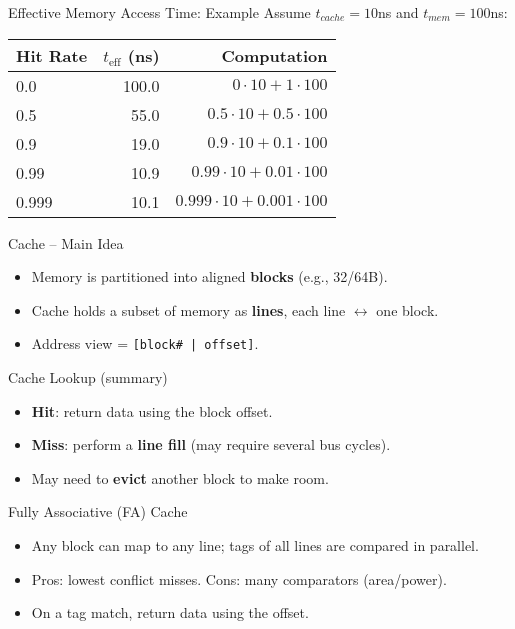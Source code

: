\documentclass[aspectratio=169,12pt]{beamer}
\begin{document}
\begin{frame}{Effective Memory Access Time: Example}
Assume $t_{cache}=10$ns and $t_{mem}=100$ns:
\begin{center}
\begin{tabular}{lrr}
\toprule
Hit Rate & $t_{\text{eff}}$ (ns) & Computation\\
\midrule
0.0   & 100.0 & $0\cdot 10 + 1\cdot 100$\\
0.5   & 55.0  & $0.5\cdot 10 + 0.5\cdot 100$\\
0.9   & 19.0  & $0.9\cdot 10 + 0.1\cdot 100$\\
0.99  & 10.9  & $0.99\cdot 10 + 0.01\cdot 100$\\
0.999 & 10.1  & $0.999\cdot 10 + 0.001\cdot 100$\\
\bottomrule
\end{tabular}
\end{center}
\end{frame}

\begin{frame}{Cache -- Main Idea}
\begin{itemize}
  \item Memory is partitioned into aligned \textbf{blocks} (e.g., 32/64B).
  \item Cache holds a subset of memory as \textbf{lines}, each line $\leftrightarrow$ one block.
  \item Address view = \texttt{[block\# | offset]}.
\end{itemize}
\end{frame}

\begin{frame}{Cache Lookup (summary)}
\begin{itemize}
  \item \textbf{Hit}: return data using the block offset.
  \item \textbf{Miss}: perform a \textbf{line fill} (may require several bus cycles).
  \item May need to \textbf{evict} another block to make room.
\end{itemize}
\end{frame}

\begin{frame}{Fully Associative (FA) Cache}
\begin{itemize}
  \item Any block can map to any line; tags of all lines are compared in parallel.
  \item Pros: lowest conflict misses. Cons: many comparators (area/power).
  \item On a tag match, return data using the offset.
\end{itemize}
\end{frame}
\end{document}
